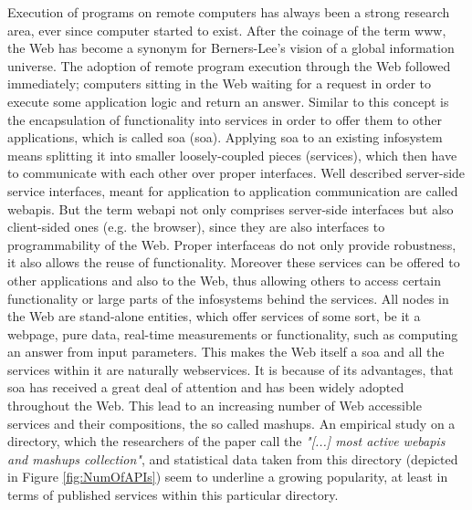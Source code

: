 Execution of programs on remote computers has always been a strong research area, ever since computer started to exist.
After the coinage of the term \textrm{\gls{www}}\cite{DBLP:journals/en/Berners-LeeCGP92}, the Web has become a synonym for Berners-Lee's vision of a global information universe.
The adoption of remote program execution through the Web followed immediately; computers sitting in the Web waiting for a request in order to execute some application logic and return an answer.
Similar to this concept is the encapsulation of functionality into services\cite{peltz2003web} in order to offer them to other applications, which is called \textrm{\acrlong{soa} (\acrshort{soa})}\cite{perrey2003service}.
Applying \textrm{\acrshort{soa}} to an existing \textrm{\gls{infosystem}} means splitting it into smaller loosely-coupled pieces (services), which then have to communicate with each other over proper interfaces.
Well described server-side service interfaces, meant for application to application communication are called \textrm{\glspl{webapi}}. 
But the term \textrm{\gls{webapi}} not only comprises server-side interfaces but also client-sided ones (e.g. the browser), since they are also interfaces to programmability of the Web.
Proper interfaceas do not only provide robustness, it also allows the reuse of functionality.
Moreover these services can be offered to other applications and also to the Web, thus allowing others to access certain functionality or large parts of the \textrm{\glspl{infosystem}} behind the services.
All nodes in the Web are stand-alone entities, which offer services of some sort, be it a webpage, pure data, real-time measurements or functionality, such as computing an answer from input parameters.
This makes the Web itself a \textrm{\acrlong{soa}} and all the services within it are naturally \textrm{\glspl{webservice}}.
It is because of its advantages, that \textrm{\acrshort{soa}} has received a great deal of attention and has been widely adopted throughout the Web.
This lead to an increasing number of Web accessible services and their compositions, the so called \textrm{\glspl{mashup}}.
An empirical study\cite{conf/icws/HuangFT12} on a directory, which the researchers of the paper call the \textit{"[...] most active \gls{webapi}s and mashups collection"}, and statistical data taken from this directory (depicted in Figure \ref{fig:NumOfAPIs}) seem to underline a growing popularity, at least in terms of published services within this particular directory.


